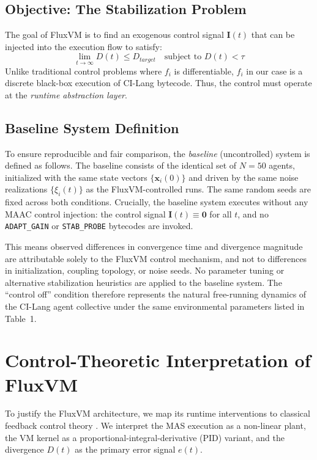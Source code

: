 \documentclass{article}
\begin{document}
\subsection{Objective: The Stabilization Problem}
The goal of FluxVM is to find an exogenous control signal $\mathbf{I}(t)$ that can be injected into the execution flow to satisfy:
\begin{equation}
    \lim_{t \to \infty} D(t) \le D_{target} \quad \text{subject to } D(t) < \tau
\end{equation}
Unlike traditional control problems where $f_i$ is differentiable, $f_i$ in our case is a discrete black-box execution of CI-Lang bytecode. Thus, the control must operate at the \textit{runtime abstraction layer}.

\subsection{Baseline System Definition}
\label{sec:baseline_definition}

To ensure reproducible and fair comparison, the \emph{baseline} (uncontrolled) system is defined as follows. The baseline consists of the identical set of $N=50$ agents, initialized with the same state vectors $\{\mathbf{x}_i(0)\}$ and driven by the same noise realizations $\{\xi_i(t)\}$ as the FluxVM-controlled runs. The same random seeds are fixed across both conditions. Crucially, the baseline system executes without any MAAC control injection: the control signal $\mathbf{I}(t) \equiv \mathbf{0}$ for all $t$, and no \texttt{ADAPT\_GAIN} or \texttt{STAB\_PROBE} bytecodes are invoked.

This means observed differences in convergence time and divergence magnitude are attributable solely to the FluxVM control mechanism, and not to differences in initialization, coupling topology, or noise seeds. No parameter tuning or alternative stabilization heuristics are applied to the baseline system. The ``control off'' condition therefore represents the natural free-running dynamics of the CI-Lang agent collective under the same environmental parameters listed in Table~1.

\section{Control-Theoretic Interpretation of FluxVM}
\label{sec:control_interpretation}

To justify the FluxVM architecture, we map its runtime interventions to classical feedback control theory \cite{astrom2010feedback}. We interpret the MAS execution as a non-linear plant, the VM kernel as a proportional-integral-derivative (PID) variant, and the divergence $D(t)$ as the primary error signal $e(t)$.
\end{document}
